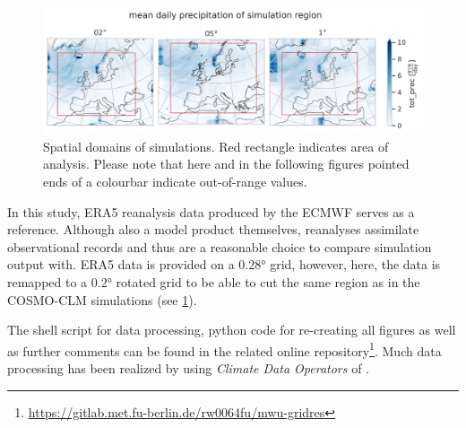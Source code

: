 \begin{figure}
	\centering
	\includegraphics[width=\figwidth]{../figs/1-regionbox.png}
	\caption{Spatial domains of simulations. Red rectangle indicates area of analysis. Please note that here and in the following figures pointed ends of a colourbar indicate out-of-range values.}
	\label{fig:regionbox}
\end{figure}
	
In this study, ERA5 reanalysis data produced by the ECMWF serves as a reference. Although also a model product themselves, reanalyses assimilate observational records and thus are a reasonable choice to compare simulation output with. ERA5 data is provided on a 0.28° grid, however, here, the data is remapped to a 0.2° rotated grid to be able to cut the same region as in the COSMO-CLM simulations (see \cref{fig:regionbox}).

The shell script for data processing, python code for re-creating all figures as well as further comments can be found in the related online repository\footnote{\url{https://gitlab.met.fu-berlin.de/rw0064fu/mwu-gridres}}. Much data processing has been realized by using \textit{Climate Data Operators} of \textcite{schulzweida2022}. 